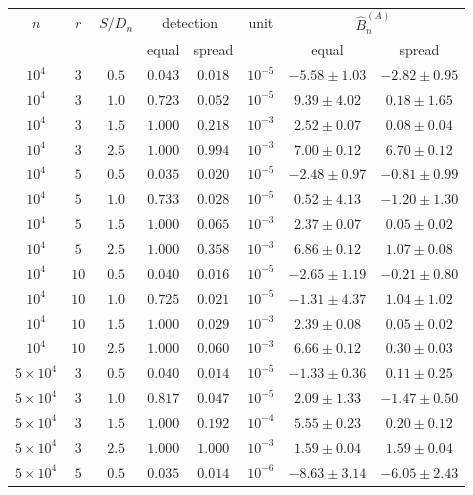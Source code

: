 \begin{table}[H]
\centering
\footnotesize
\setlength{\tabcolsep}{4pt}
\begin{tabular}{cccccccc}
\toprule
$n$ & $r$ & $S/D_n$ & \multicolumn{2}{c}{detection} & unit & \multicolumn{2}{c}{$\widehat B_n^{(A)}$}\\
 & & & equal & spread & & equal & spread\\
\midrule
$10^4$ & $3$ & $0.5$ & $0.043$ & $0.018$ & $10^{-5}$ & $-5.58\pm1.03$ & $-2.82\pm0.95$\\
$10^4$ & $3$ & $1.0$ & $0.723$ & $0.052$ & $10^{-5}$ & $9.39\pm4.02$ & $0.18\pm1.65$\\
$10^4$ & $3$ & $1.5$ & $1.000$ & $0.218$ & $10^{-3}$ & $2.52\pm0.07$ & $0.08\pm0.04$\\
$10^4$ & $3$ & $2.5$ & $1.000$ & $0.994$ & $10^{-3}$ & $7.00\pm0.12$ & $6.70\pm0.12$\\
$10^4$ & $5$ & $0.5$ & $0.035$ & $0.020$ & $10^{-5}$ & $-2.48\pm0.97$ & $-0.81\pm0.99$\\
$10^4$ & $5$ & $1.0$ & $0.733$ & $0.028$ & $10^{-5}$ & $0.52\pm4.13$ & $-1.20\pm1.30$\\
$10^4$ & $5$ & $1.5$ & $1.000$ & $0.065$ & $10^{-3}$ & $2.37\pm0.07$ & $0.05\pm0.02$\\
$10^4$ & $5$ & $2.5$ & $1.000$ & $0.358$ & $10^{-3}$ & $6.86\pm0.12$ & $1.07\pm0.08$\\
$10^4$ & $10$ & $0.5$ & $0.040$ & $0.016$ & $10^{-5}$ & $-2.65\pm1.19$ & $-0.21\pm0.80$\\
$10^4$ & $10$ & $1.0$ & $0.725$ & $0.021$ & $10^{-5}$ & $-1.31\pm4.37$ & $1.04\pm1.02$\\
$10^4$ & $10$ & $1.5$ & $1.000$ & $0.029$ & $10^{-3}$ & $2.39\pm0.08$ & $0.05\pm0.02$\\
$10^4$ & $10$ & $2.5$ & $1.000$ & $0.060$ & $10^{-3}$ & $6.66\pm0.12$ & $0.30\pm0.03$\\
\midrule
$5{\times}10^4$ & $3$ & $0.5$ & $0.040$ & $0.014$ & $10^{-5}$ & $-1.33\pm0.36$ & $0.11\pm0.25$\\
$5{\times}10^4$ & $3$ & $1.0$ & $0.817$ & $0.047$ & $10^{-5}$ & $2.09\pm1.33$ & $-1.47\pm0.50$\\
$5{\times}10^4$ & $3$ & $1.5$ & $1.000$ & $0.192$ & $10^{-4}$ & $5.55\pm0.23$ & $0.20\pm0.12$\\
$5{\times}10^4$ & $3$ & $2.5$ & $1.000$ & $1.000$ & $10^{-3}$ & $1.59\pm0.04$ & $1.59\pm0.04$\\
$5{\times}10^4$ & $5$ & $0.5$ & $0.035$ & $0.014$ & $10^{-6}$ & $-8.63\pm3.14$ & $-6.05\pm2.43$\\

\end{tabular}
\end{table}

